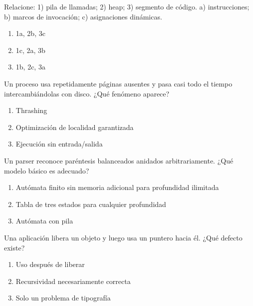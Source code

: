 \noindent\begin{minipage}{\linewidth}\setlength{\parskip}{4pt}\label{q:S-051}
Relacione: 1) pila de llamadas; 2) heap; 3) segmento de código. a) instrucciones; b) marcos de invocación; c) asignaciones dinámicas.
\begin{enumerate}[label=\Alph*),nosep]
\item 1a, 2b, 3c
\item 1c, 2a, 3b
\item 1b, 2c, 3a
\end{enumerate}\end{minipage}\par\medskip

\noindent\begin{minipage}{\linewidth}\setlength{\parskip}{4pt}\label{q:S-052}
Un proceso usa repetidamente páginas ausentes y pasa casi todo el tiempo intercambiándolas con disco. ¿Qué fenómeno aparece?
\begin{enumerate}[label=\Alph*),nosep]
\item Thrashing
\item Optimización de localidad garantizada
\item Ejecución sin entrada/salida
\end{enumerate}\end{minipage}\par\medskip

\noindent\begin{minipage}{\linewidth}\setlength{\parskip}{4pt}\label{q:S-053}
Un parser reconoce paréntesis balanceados anidados arbitrariamente. ¿Qué modelo básico es adecuado?
\begin{enumerate}[label=\Alph*),nosep]
\item Autómata finito sin memoria adicional para profundidad ilimitada
\item Tabla de tres estados para cualquier profundidad
\item Autómata con pila
\end{enumerate}\end{minipage}\par\medskip

\noindent\begin{minipage}{\linewidth}\setlength{\parskip}{4pt}\label{q:S-054}
Una aplicación libera un objeto y luego usa un puntero hacia él. ¿Qué defecto existe?
\begin{enumerate}[label=\Alph*),nosep]
\item Uso después de liberar
\item Recursividad necesariamente correcta
\item Solo un problema de tipografía
\end{enumerate}\end{minipage}\par\medskip

